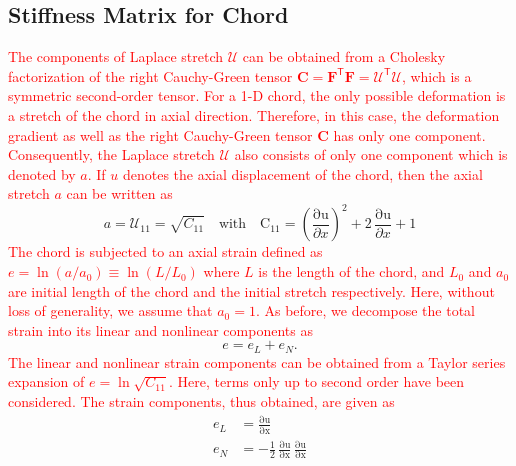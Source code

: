 \subsection{Stiffness Matrix for Chord}

\textcolor{red}{The components of Laplace stretch $\boldsymbol{\mathcal{U}}$ can be obtained from a Cholesky factorization of the right Cauchy-Green tensor $\mathbf{C} = \mathbf{F}^{\mathsf{T}} \mathbf{F} = \boldsymbol{\mathcal{U}}^{\mathsf{T}} \boldsymbol{\mathcal{U}}$, which is a symmetric second-order tensor. For a 1-D chord, the only possible deformation is a stretch of the chord in axial direction. Therefore, in this case, the deformation gradient as well as the right Cauchy-Green tensor $\mathbf{C}$ has only one component. Consequently, the Laplace stretch $\boldsymbol{\mathcal{U}}$ also consists of only one component which is denoted by $a$. If $u$ denotes the axial displacement of the chord, then the axial stretch $a$ can be written as}
\begin{equation}
a = {\mathcal{U}}_{11} = \sqrt{C_{11}}  \quad \text{with} \quad \mathrm{C_{11}} = \left(\frac{\mathrm{\partial u}}{\partial x}\right)^2 + 2\, \frac{\mathrm{\partial u}}{\partial x}  + 1
\end{equation} 
\textcolor{red}{The chord is subjected to an axial strain defined as $e = \ln ( a / a_0 ) \equiv \ln ( L / L_0 )$ where $L$ is the length of the chord, and $L_0$ and $a_0$ are initial length of the chord and the initial stretch respectively. Here, without loss of generality, we assume that $a_0=1$. As before, we decompose the total strain into its linear and nonlinear components as}
\begin{equation}
e = e_{L} + e_{N}. 
\end{equation}
\textcolor{red}{The linear and nonlinear strain components can be obtained from a Taylor series expansion of $e = \ln \sqrt{C_{11}}$. Here, terms only up to second order have been considered. The strain components, thus obtained, are given as} 
\begin{subequations}
	\begin{align}
	e_{L} & = \mathrm{\frac{\partial u}{\partial x}} \\
	e_{N} & = -\frac{1}{2} \, \mathrm{\frac{\partial u}{\partial x}}\, \mathrm{\frac{\partial u}{\partial x}}
	\end{align}
\end{subequations}

